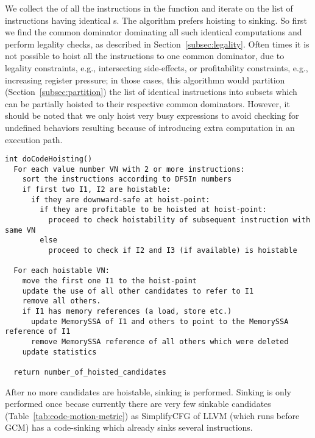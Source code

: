\documentclass[acmlarge,review,anonymous]{acmart}\settopmatter{printfolios=true}
\begin{document}
We collect the \GVN{} of all the instructions in the function and iterate on the
list of instructions having identical \GVN{}s. The algorithm prefers hoisting to
sinking. So first we find the common dominator dominating all such identical
computations and perform legality checks, as described in
Section~\ref{subsec:legality}. Often times it is not possible to hoist all the
instructions to one common dominator, due to legality constraints, e.g.,
intersecting side-effects, or profitability constraints, e.g., increasing
register pressure; in those cases, this algorithmn would partition
(Section~\ref{subsec:partition}) the list of identical instructions into subsets
which can be partially hoisted to their respective common dominators. However,
it should be noted that we only hoist very busy expressions to avoid checking
for undefined behaviors resulting because of introducing extra computation in an
execution path.

\begin{verbatim}
int doCodeHoisting()
  For each value number VN with 2 or more instructions:
    sort the instructions according to DFSIn numbers
    if first two I1, I2 are hoistable:
      if they are downward-safe at hoist-point:
        if they are profitable to be hoisted at hoist-point:
          proceed to check hoistability of subsequent instruction with same VN
        else
          proceed to check if I2 and I3 (if available) is hoistable

  For each hoistable VN:
    move the first one I1 to the hoist-point
    update the use of all other candidates to refer to I1
    remove all others.
    if I1 has memory references (a load, store etc.)
      update MemorySSA of I1 and others to point to the MemorySSA reference of I1
      remove MemorySSA reference of all others which were deleted
    update statistics

  return number_of_hoisted_candidates
\end{verbatim}

After no more candidates are hoistable, sinking is performed. Sinking is only
performed once becase currently there are very few sinkable candidates
(Table~\ref{tab:code-motion-metric}) as SimplifyCFG of LLVM (which runs before
GCM) has a code-sinking which already sinks several instructions.
\end{document}

